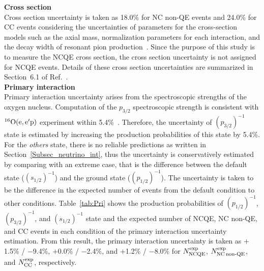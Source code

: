 \textbf{Cross section}\\
\hs
Cross section uncertainty is taken as 18.0\% for NC non-QE events and 24.0\% for CC events considering the uncertainties of parameters for the cross-section models such as the axial mass, normalization parameters for each interaction, and the decay width of resonant pion production~\cite{2014Abe,2015HuangPhD}.
Since the purpose of this study is to measure the NCQE cross section, the cross section uncertainty is not assigned for NCQE events.
Details of these cross section uncertainties are summarized in Section~6.1 of Ref.~\cite{2015HuangPhD}.\\

\textbf{Primary interaction}\\
\hs
Primary interaction uncertainty arises from the spectroscopic strengths of the oxygen nucleus.
Computation of the $p_{3/2}$ spectroscopic strength is consistent with $^{16}{\rm O}({\rm e}, {\rm e}^{\prime}{\rm p})$ experiment within 5.4\%~\cite{2012Ankowski,1994Leuschner}.
Therefore, the uncertainty of $(p_{3/2})^{-1}$ state is estimated by increasing the production probabilities of this state by 5.4\%.
For the \textit{others} state, there is no reliable predictions as written in Section~\ref{Subsec_neutrino_int}, thus the uncertainty is conservatively estimated by comparing with an extreme case, that is the difference between the default state ($(s_{1/2})^{-1}$) and the ground state ($(p_{1/2})^{-1}$).
The uncertainty is taken to be the difference in the expected number of events from the default condition to other conditions.
Table~\ref{tab:Pri} shows the production probabilities of $(p_{1/2})^{-1}$, $(p_{3/2})^{-1}$, and $(s_{1/2})^{-1}$ state and the expected number of NCQE, NC non-QE, and CC events in each condition of the primary interaction uncertainty estimation.
From this result, the primary interaction uncertainty is taken as $+$1.5\% / $-$9.4\%, $+$0.0\% / $-$2.4\%, and $+$1.2\% / $-$8.0\% for $N^{\rm exp}_{\rm NCQE}$, $N^{\rm exp}_{\rm NC\,non\mathchar`-QE}$, and $N^{\rm exp}_{\rm CC}$, respectively.\\

